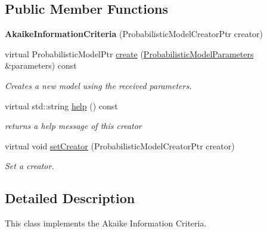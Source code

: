 \subsection*{Public Member Functions}
\begin{DoxyCompactItemize}
\item 
\mbox{\label{classtops_1_1AkaikeInformationCriteria_a49e40b8fa596e3185f3a12caca7b4201}} 
{\bfseries Akaike\+Information\+Criteria} (Probabilistic\+Model\+Creator\+Ptr creator)
\item 
virtual Probabilistic\+Model\+Ptr \hyperlink{classtops_1_1AkaikeInformationCriteria_a925de08fa8373de8f7ddf48cd6b2c6e0}{create} (\hyperlink{classtops_1_1ProbabilisticModelParameters}{Probabilistic\+Model\+Parameters} \&parameters) const
\begin{DoxyCompactList}\small\item\em Creates a new model using the received parameters. \end{DoxyCompactList}\item 
\mbox{\label{classtops_1_1AkaikeInformationCriteria_ab0460e83a273c2e87f5009bd3a1177fd}} 
virtual std\+::string \hyperlink{classtops_1_1AkaikeInformationCriteria_ab0460e83a273c2e87f5009bd3a1177fd}{help} () const
\begin{DoxyCompactList}\small\item\em returns a help message of this creator \end{DoxyCompactList}\item 
\mbox{\label{classtops_1_1AkaikeInformationCriteria_a5294784ba6eaa8ba35c7f21b9bcedc70}} 
virtual void \hyperlink{classtops_1_1AkaikeInformationCriteria_a5294784ba6eaa8ba35c7f21b9bcedc70}{set\+Creator} (Probabilistic\+Model\+Creator\+Ptr creator)
\begin{DoxyCompactList}\small\item\em Set a creator. \end{DoxyCompactList}\end{DoxyCompactItemize}


\subsection{Detailed Description}
This class implements the Akaike Information Criteria. 

